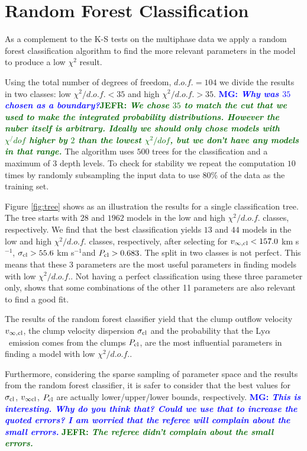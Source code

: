 \documentclass[a4,useAMS,usenatbib,usegraphicx]{mn2e}
\newcommand{\lya}{\ifmmode{{\rm Ly}\alpha}\else Ly$\alpha$\ \fi}
\newcommand{\kms}{km s$^{-1}$}
\newcommand{\mg}[1]{\textcolor{blue}{\bf MG: \textit{#1}}}
\newcommand{\jefr}[1]{\textcolor{darkgreen}{\bf JEFR: \textit{#1}}}
\begin{document}
\appendix
\section{Random Forest Classification}
\label{appendix}

As a complement to the K-S tests on the multiphase data 
we apply a random forest classification algorithm to find the
more relevant parameters in the model to produce a low $\chi^2$
result. 

Using the total number of degrees of freedom, $d.o.f.=104$ we divide
the results in two classes: low $\chi^2/d.o.f.<35$ and high
$\chi^2/d.o.f.>35$. \mg{Why was $35$ chosen as a boundary?}\jefr{We
  chose $35$ to match the cut that we used to make the  integrated
  probability distributions. However the nuber itself is
  arbitrary. Ideally we should only chose models with $\chi^/dof$
  higher by $2$ than the lowest $\chi^2/dof$, but we don't have any
  models in that range.}
The algorithm uses $500$ trees for the classification and a
maximum of $3$ depth levels. 
To check for stability we repeat the computation $10$ times by
randomly subsampling the input data to use $80\%$ of the data as
the training set.



Figure \ref{fig:tree} shows as an illustration the results for a
single classification tree.
The tree starts with $28$ and $1962$ models in the low and high
$\chi^2/d.o.f.$ classes, respectively. 
We find that the best classification
yields $13$ and $44$ models in the low and high $\chi^2/d.o.f.$
classes, respectively, after selecting for $v_{\infty,{\rm cl}}<157.0$ \kms,
$\sigma_{{\rm cl}}>55.6$ \kms and $P_{\rm cl}>0.683$. 
The split in two classes is not perfect. 
This means that these 3 parameters are the most useful parameters
in finding models with low $\chi^2/d.o.f.$.
Not having a perfect classification using these three parameter only,
shows that some combinations of the other 11 parameters are also
relevant to find a good fit.


The results of the random forest classifier yield that the clump outflow velocity
$v_{\infty,\rm{cl}}$, the clump velocity dispersion $\sigma_{\rm cl}$ and the probability
that the \lya emission comes from the clumps $P_{\rm cl}$, are the
most influential parameters in finding a model with low
$\chi^2/d.o.f.$.

Furthermore, considering the sparse sampling of parameter space and the results
from the random forest classifier, it is safer to consider that
the best values for $\sigma_{\rm cl}$, $v_{\infty {\rm cl}}$, $P_{\rm
  cl}$ are actually lower/upper/lower bounds, respectively.
\mg{This is interesting. Why do you think that? Could we use that to
  increase the quoted errors? I am worried that the referee will
  complain about the small errors.} \jefr{The referee didn't complain
  about the small errors.}
\end{document}
